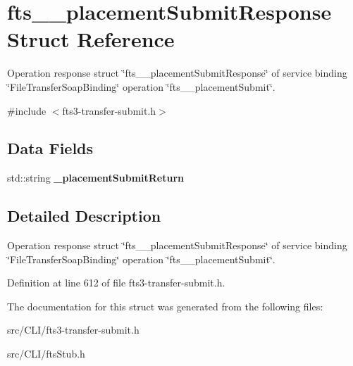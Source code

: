 \section{fts\_\-\_\-placementSubmitResponse Struct Reference}
\label{structfts____placementSubmitResponse}


Operation response struct \char`\"{}fts\_\-\_\-placementSubmitResponse\char`\"{} of service binding \char`\"{}FileTransferSoapBinding\char`\"{} operation \char`\"{}fts\_\-\_\-placementSubmit\char`\"{}.  




{\ttfamily \#include $<$fts3-\/transfer-\/submit.h$>$}

\subsection*{Data Fields}
\begin{DoxyCompactItemize}
\item 
std::string {\bfseries \_\-placementSubmitReturn}\label{structfts____placementSubmitResponse_a0d3f1d3550ed02c3276f862d403e1184}

\end{DoxyCompactItemize}


\subsection{Detailed Description}
Operation response struct \char`\"{}fts\_\-\_\-placementSubmitResponse\char`\"{} of service binding \char`\"{}FileTransferSoapBinding\char`\"{} operation \char`\"{}fts\_\-\_\-placementSubmit\char`\"{}. 

Definition at line 612 of file fts3-\/transfer-\/submit.h.



The documentation for this struct was generated from the following files:\begin{DoxyCompactItemize}
\item 
src/CLI/fts3-\/transfer-\/submit.h\item 
src/CLI/ftsStub.h\end{DoxyCompactItemize}
